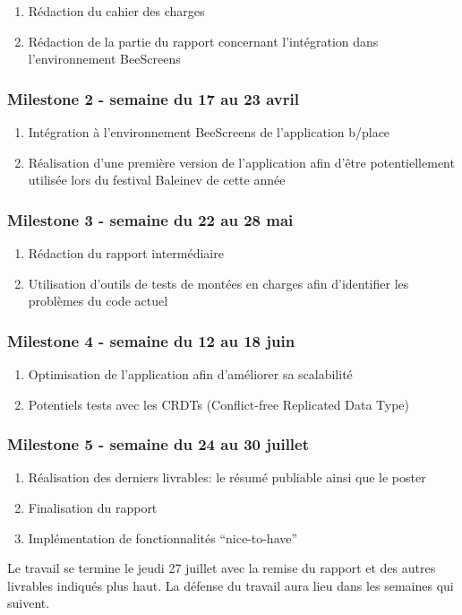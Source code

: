 \begin{enumerate}
  \item Rédaction du cahier des charges
  \item Rédaction de la partie du rapport concernant l'intégration dans l'environnement BeeScreens
\end{enumerate}

\subsubsection{Milestone 2 - semaine du 17 au 23 avril}

\begin{enumerate}
  \item Intégration à l'environnement BeeScreens de l'application b/place
  \item Réalisation d'une première version de l'application afin d'être potentiellement utilisée lors du festival Baleinev de cette année
\end{enumerate}

\subsubsection{Milestone 3 - semaine du 22 au 28 mai}

\begin{enumerate}
  \item Rédaction du rapport intermédiaire
  \item Utilisation d'outils de tests de montées en charges afin d'identifier les problèmes du code actuel
\end{enumerate}

\subsubsection{Milestone 4 - semaine du 12 au 18 juin}

\begin{enumerate}
  \item Optimisation de l'application afin d'améliorer sa scalabilité
  \item Potentiels tests avec les CRDTs (Conflict-free Replicated Data Type)
\end{enumerate}

\subsubsection{Milestone 5 - semaine du 24 au 30 juillet}

\begin{enumerate}
  \item Réalisation des derniers livrables: le résumé publiable ainsi que le poster
  \item Finalisation du rapport
  \item Implémentation de fonctionnalités “nice-to-have”
\end{enumerate}

Le travail se termine le jeudi 27 juillet avec la remise du rapport et des autres livrables indiqués plus haut. La défense du travail aura lieu dans les semaines qui suivent.
